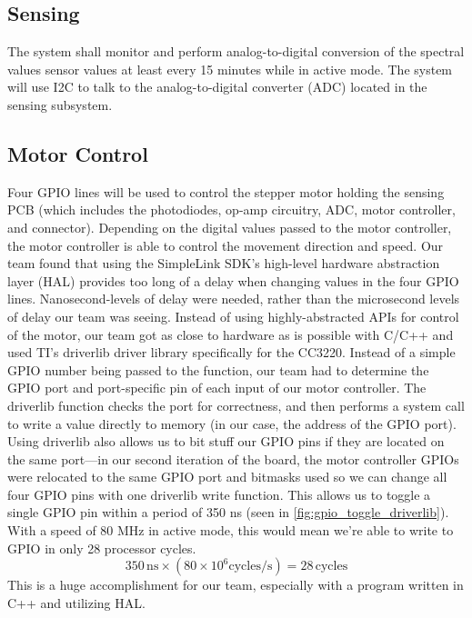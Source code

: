 \subsection{Sensing} The system shall monitor and perform analog-to-digital conversion of the spectral values sensor values at least every 15 minutes while in active mode. The system will use I2C to talk to the analog-to-digital converter (ADC) located in the sensing subsystem. 

\subsection{Motor Control} Four GPIO lines will be used to control the stepper motor holding the sensing PCB (which includes the photodiodes, op-amp circuitry, ADC, motor controller, and connector). Depending on the digital values passed to the motor controller, the motor controller is able to control the movement direction and speed. Our team found that using the SimpleLink SDK's high-level hardware abstraction layer (HAL) provides too long of a delay when changing values in the four GPIO lines. Nanosecond-levels of delay were needed, rather than the microsecond levels of delay our team was seeing. Instead of using highly-abstracted APIs for control of the motor, our team got as close to hardware as is possible with C/C++ and used TI's driverlib driver library specifically for the CC3220. Instead of a simple GPIO number being passed to the function, our team had to determine the GPIO port and port-specific pin of each input of our motor controller. The driverlib function checks the port for correctness, and then performs a system call to write a value directly to memory (in our case, the address of the GPIO port). Using driverlib also allows us to bit stuff our GPIO pins if they are located on the same port---in our second iteration of the board, the motor controller GPIOs were relocated to the same GPIO port and bitmasks used so we can change all four GPIO pins with one driverlib write function. This allows us to toggle a single GPIO pin within a period of 350 ns (seen in \ref{fig:gpio_toggle_driverlib}). With a speed of 80 MHz in active mode, this would mean we're able to write to GPIO in only 28 processor cycles.
\begin{equation}
    350\,\mathrm{ns} \times (80\times10^6\mathrm{cycles/s}) = 28\,\mathrm{cycles}
\end{equation}
This is a huge accomplishment for our team, especially with a program written in C++ and utilizing HAL.

